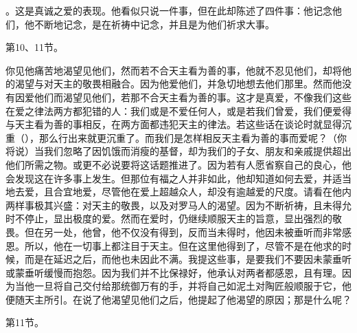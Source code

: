 。这是真诚之爱的表现。他看似只说一件事，但在此却陈述了四件事：他记念他们，他不断地记念，是在祈祷中记念，并且是为他们祈求大事。\par

第10、11节。\par

你见他痛苦地渴望见他们，然而若不合天主看为善的事，他就不忍见他们，却将他的渴望与对天主的敬畏相融合。因为他爱他们，并急切地想去他们那里。然而他没有因爱他们而渴望见他们，若那不合天主看为善的事。这才是真爱，不像我们这些在爱之律法两方都犯错的人：我们或是不爱任何人，或是若我们曾爱，我们便爱得与天主看为善的事相反，在两方面都违犯天主的律法。若这些话在谈论时就显得沉重（），那么行出来就更沉重了。而我们是怎样相反天主看为善的事而爱呢？（你将说）当我们忽略了因饥饿而消瘦的基督，却为我们的子女、朋友和亲戚提供超出他们所需之物。或更不必说要将这话题推进了。因为若有人愿省察自己的良心，他会发现这在许多事上发生。但那位有福之人并非如此，他却知道如何去爱，并适当地去爱，且合宜地爱，尽管他在爱上超越众人，却没有逾越爱的尺度。请看在他内两样事极其兴盛：对天主的敬畏，以及对罗马人的渴望。因为不断祈祷，且未得允时不停止，显出极度的爱。然而在爱时，仍继续顺服天主的旨意，显出强烈的敬畏。但在另一处，他曾，他不仅没有得到，反而当未得时，他因未被垂听而非常感恩。所以，他在一切事上都注目于天主。但在这里他得到了，尽管不是在他求的时候，而是在延迟之后，而他也未因此不满。我提这些事，是要我们不要因未蒙垂听或蒙垂听缓慢而抱怨。因为我们并不比保禄好，他承认对两者都感恩，且有理。因为当他一旦将自己交付给那统御万有的手，并将自己如泥土对陶匠般顺服于它，他便随天主所引。在说了他渴望见他们之后，他提起了他渴望的原因；那是什么呢？\par

第11节。 \par

